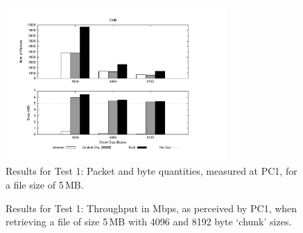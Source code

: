 \begin{figure}[h!]

    \centering
    \includegraphics[width=0.75\textwidth]{figures/udp_5.pdf}
    \cprotect\caption{Results for Test 1: Packet and byte quantities, measured 
        at PC1, for a file size of 5\,MB.}
    \label{fig:test-1-packtes-bytes-5}

\end{figure}

\begin{figure}[h!]
    \centering



    \cprotect\caption{Results for Test 1: Throughput in Mbps, as perceived by 
        PC1, when retrieving a file of size 5\,MB with 4096 and 8192 byte 
        `chunk' sizes.}
    \label{fig:udp_5}

\end{figure}

